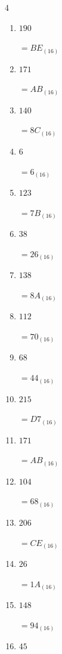 \begin{multicols}{4}
\begin{enumerate}
        $=F6_{(16)}$

  \item $190$

        $=BE_{(16)}$

  \item $171$

        $=AB_{(16)}$

\columnbreak %

\resetques

  \item $140$

        $=8C_{(16)}$

  \item $6$

        $=6_{(16)}$

  \item $123$

        $=7B_{(16)}$

  \item $38$

        $=26_{(16)}$

  \item $138$

        $=8A_{(16)}$

  \item $112$

        $=70_{(16)}$

  \item $68$

        $=44_{(16)}$

  \item $215$

        $=D7_{(16)}$

  \item $171$

        $=AB_{(16)}$

  \item $104$

        $=68_{(16)}$

  \item $206$

        $=CE_{(16)}$

  \item $26$

        $=1A_{(16)}$

  \item $148$

        $=94_{(16)}$

  \item $45$


\end{enumerate}
\end{multicols}
